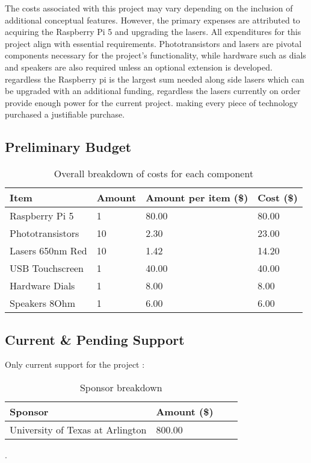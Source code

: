 The costs associated with this project may vary depending on the inclusion of additional conceptual features. However, the primary expenses are attributed to acquiring the Raspberry Pi 5 and upgrading the lasers. All expenditures for this project align with essential requirements. Phototransistors and lasers are pivotal components necessary for the project's functionality, while hardware such as dials and speakers are also required unless an optional extension is developed. regardless the Raspberry pi is the largest sum needed along side lasers which can be upgraded with an additional funding, regardless the lasers currently on order provide enough power for the current project. making every piece of technology purchased a justifiable purchase.

\subsection{Preliminary Budget}


\begin{table}[H]
\centering  %
\begin{tabular}{|l|l|l|l|}
\hline
\textbf{Item} & \textbf{Amount} & \textbf{Amount per item (\$)} & \textbf{Cost (\$)} \\ \hline
Raspberry Pi 5 & 1 & 80.00 & 80.00 \\ \hline
Phototransistors & 10 & 2.30 & 23.00 \\ \hline
Lasers 650nm Red & 10 & 1.42 & 14.20 \\ \hline
USB Touchscreen & 1 & 40.00 & 40.00 \\ \hline
Hardware Dials & 1 & 8.00 & 8.00 \\ \hline
Speakers 8Ohm & 1 & 6.00 & 6.00 \\ \hline
\end{tabular}
\caption{Overall breakdown of costs for each component}
\end{table}



\subsection{Current \& Pending Support}
Only current support for the project :

    


\begin{table}[H]
\centering  %
\begin{tabular}{|l|l|l|l|}
\hline
\textbf{Sponsor} &  \textbf{Amount (\$)}  \\ \hline
University of Texas at Arlington & 800.00\\ \hline

\end{tabular}
\caption{Sponsor breakdown}
\end{table}                                                                                
                                                    .









